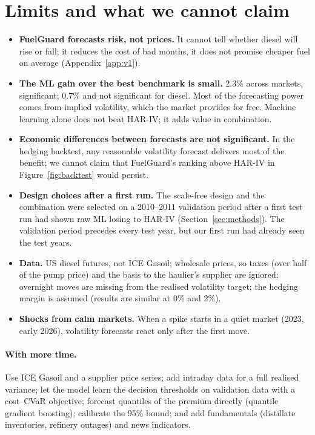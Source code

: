 \section{Limits and what we cannot claim}\label{sec:limits}

\begin{itemize}
\item \textbf{FuelGuard forecasts risk, not prices.} It cannot tell whether diesel will rise or fall; it
reduces the cost of bad months, it does not promise cheaper fuel on average (Appendix~\ref{app:v1}).
\item \textbf{The ML gain over the best benchmark is small.} 2.3\% across markets, significant; 0.7\% and
not significant for diesel. Most of the forecasting power comes from implied volatility, which the market
provides for free. Machine learning alone does not beat HAR-IV; it adds value in combination.
\item \textbf{Economic differences between forecasts are not significant.} In the hedging backtest, any
reasonable volatility forecast delivers most of the benefit; we cannot claim that FuelGuard's ranking above
HAR-IV in Figure~\ref{fig:backtest} would persist.
\item \textbf{Design choices after a first run.} The scale-free design and the combination were selected on
a 2010--2011 validation period after a first test run had shown raw ML losing to HAR-IV (Section~\ref{sec:methods}).
The validation period precedes every test year, but our first run had already seen the test years.
\item \textbf{Data.} US diesel futures, not ICE Gasoil; wholesale prices, so taxes (over half of the pump
price) and the basis to the haulier's supplier are ignored; overnight moves are missing from the realised
volatility target; the hedging margin is assumed (results are similar at 0\% and 2\%).
\item \textbf{Shocks from calm markets.} When a spike starts in a quiet market (2023, early 2026),
volatility forecasts react only after the first move.
\end{itemize}

\paragraph{With more time.} Use ICE Gasoil and a supplier price series; add intraday data for a full
realised variance; let the model learn the decision thresholds on validation data with a cost--CVaR
objective; forecast quantiles of the premium directly (quantile gradient boosting); calibrate the 95\%
bound; and add fundamentals (distillate inventories, refinery outages) and news indicators.

